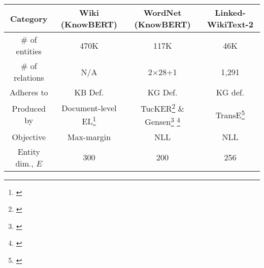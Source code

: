 \begin{table}[t!]
    \centering
    \begin{tabular}{c|c|c|c}
        \textbf{Category} & \textbf{Wiki (KnowBERT)} & \textbf{WordNet (KnowBERT)} & \textbf{Linked-WikiText-2} \\\hline
        \# of entities & 470K & 117K & 46K \\
        \# of relations & N/A & 2$\times$28+1 & 1,291 \\ 
        Adheres to & KB Def. & KG Def. & KG def. \\\hline
        Produced by & Document-level EL\footnote{\cite{Ganea2017DeepAttention}} & TucKER\footnote{\cite{Balazevic2019TuckER:Completion}} \& Gensen\footnote{\cite{Subramanian2018LearningLearning}} \footnote{\cite{Balazevic2019TuckER:Completion}} & TransE\footnote{\cite{NIPS2013_5071}}\\
        Objective           & Max-margin &     NLL      &   NLL \\
        Entity dim., $E$    &   300      &     200      &   256 \\\hline 
    \end{tabular}
\end{table}